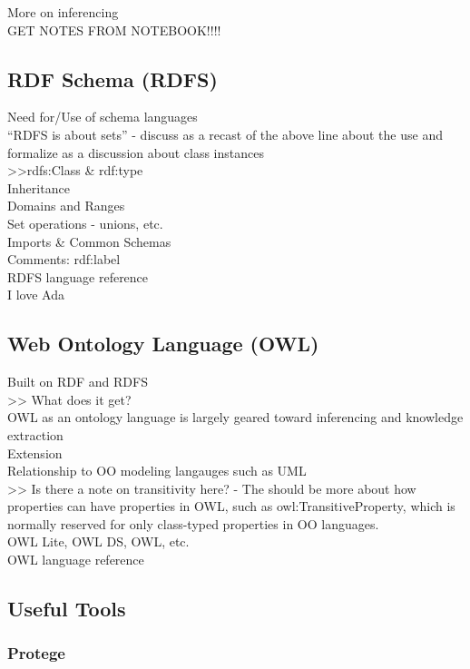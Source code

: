 More on inferencing\\
GET NOTES FROM NOTEBOOK!!!!\\


\subsection{RDF Schema (RDFS)}

Need for/Use of schema languages\\
``RDFS is about sets'' - discuss as a recast of the above line about the use and
formalize as a discussion about class instances\\
>>rdfs:Class \& rdf:type\\
Inheritance\\
Domains and Ranges\\
Set operations - unions, etc.\\
Imports \& Common Schemas\\
Comments: rdf:label\\
RDFS language reference\\

I love Ada

\subsection{Web Ontology Language (OWL)}

Built on RDF and RDFS\\
>> What does it get?\\
OWL as an ontology language is largely geared toward inferencing and knowledge
extraction\\
Extension\\
Relationship to OO modeling langauges such as UML\\
>> Is there a note on transitivity here? - The should be more about how
properties can have properties in OWL, such as owl:TransitiveProperty, which is
normally reserved for only class-typed properties in OO languages.\\
OWL Lite, OWL DS, OWL, etc.\\
OWL language reference\\

\subsection{Useful Tools}

\subsubsection{Protege}
